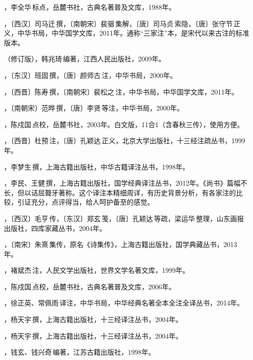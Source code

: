 ，李全华\,标点，岳麓书社，古典名著普及文库，1988年。

，〔西汉〕司马迁\,撰，〔南朝宋〕裴骃\,集解，〔唐〕司马贞\,索隐，〔唐〕张守节\,正义，中华书局，中华国学文库，2011年。通称“三家注”本，是宋代以来古注的标准版本。

（修订版），韩兆琦\,编著，江西人民出版社，2009年。

，〔东汉〕班固\,撰，〔唐〕颜师古\,注，中华书局，2000年。

，〔西晋〕陈寿\,撰，〔南朝宋〕裴松之\,注，中华书局，中华国学文库，2011年。

，〔南朝宋〕范晔\,撰，〔唐〕李贤\,等注，中华书局，2000年。

，陈戍国\,点校，岳麓书社，2003年。白文版，11合1（含春秋三传），使用方便。

，〔西晋〕杜预\,注，〔唐〕孔颖达\,正义，北京大学出版社，十三经注疏丛书，1999年。

，李梦生\,撰，上海古籍出版社，中华古籍译注丛书，1998年。

，李民、王健\,撰，上海古籍出版社，国学经典译注丛书，2012年。《尚书》篇幅不长，但以诘屈聱牙著称。这个译注本精细周详，有历史背景分析，有各家注的比较，引证充分，点评得当，给人呵护备至的感觉。

，〔西汉〕毛亨\,传，〔东汉〕郑玄\,笺，〔唐〕孔颖达\,等疏，梁运华\,整理，山东画报出版社，四库家藏丛书，2004年。

，〔南宋〕朱熹\,集传，原名《诗集传》，上海古籍出版社，国学典藏丛书，2013年。

，褚斌杰\,注，人民文学出版社，世界文学名著文库，1999年。

，陈戍国\,点校，岳麓书社，古典名著普及文库，2006年。

，徐正英、常佩雨\,译注，中华书局，中华经典名著全本全注全译丛书，2014年。

，杨天宇\,撰，上海古籍出版社，十三经译注丛书，2004年。

，杨天宇\,撰，上海古籍出版社，十三经译注丛书，2004年。

，钱玄、钱兴奇\,编著，江苏古籍出版社，1998年。

